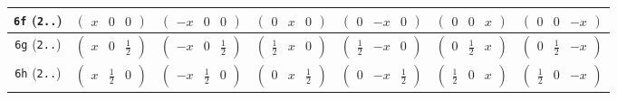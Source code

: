 \documentclass[fleqn,9pt,landscape]{jsarticle}
\begin{document}
\begin{center}
\begin{longtable}{ccccccc}
{\tt 6f} ({\tt 2..}) & $ \begin{pmatrix} x & 0 & 0 \end{pmatrix} $ & $ \begin{pmatrix} - x & 0 & 0 \end{pmatrix} $ & $ \begin{pmatrix} 0 & x & 0 \end{pmatrix} $ & $ \begin{pmatrix} 0 & - x & 0 \end{pmatrix} $ & $ \begin{pmatrix} 0 & 0 & x \end{pmatrix} $ & $ \begin{pmatrix} 0 & 0 & - x \end{pmatrix} $ \\ \hline
{\tt 6g} ({\tt 2..}) & $ \begin{pmatrix} x & 0 & \frac{1}{2} \end{pmatrix} $ & $ \begin{pmatrix} - x & 0 & \frac{1}{2} \end{pmatrix} $ & $ \begin{pmatrix} \frac{1}{2} & x & 0 \end{pmatrix} $ & $ \begin{pmatrix} \frac{1}{2} & - x & 0 \end{pmatrix} $ & $ \begin{pmatrix} 0 & \frac{1}{2} & x \end{pmatrix} $ & $ \begin{pmatrix} 0 & \frac{1}{2} & - x \end{pmatrix} $ \\ \hline
{\tt 6h} ({\tt 2..}) & $ \begin{pmatrix} x & \frac{1}{2} & 0 \end{pmatrix} $ & $ \begin{pmatrix} - x & \frac{1}{2} & 0 \end{pmatrix} $ & $ \begin{pmatrix} 0 & x & \frac{1}{2} \end{pmatrix} $ & $ \begin{pmatrix} 0 & - x & \frac{1}{2} \end{pmatrix} $ & $ \begin{pmatrix} \frac{1}{2} & 0 & x \end{pmatrix} $ & $ \begin{pmatrix} \frac{1}{2} & 0 & - x \end{pmatrix} $ \\ \hline

\end{longtable}
\end{center}
\end{document}
